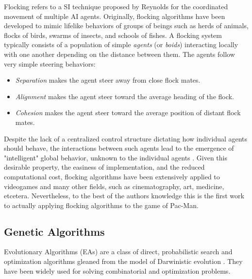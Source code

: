 \documentclass{llncs}
\begin{document}
Flocking refers to a SI technique proposed by Reynolds \cite{Reynolds87} for the coordinated movement of multiple AI agents. Originally, flocking algorithms have been developed to mimic lifelike behaviors of groups of beings such as herds of animals, flocks of birds, swarms of insects, and schools of fishes. A flocking system typically consists of a population of simple \textit{agents} (or \textit{boids}) interacting locally with one another depending on the distance between them. The agents follow very simple steering behaviors:

\begin{itemize}
	\item \textit{Separation} makes the agent steer away from close flock mates.
	\item \textit{Alignment} makes the agent steer toward the average heading of the flock.
	\item \textit{Cohesion} makes the agent steer toward the average position of distant flock mates.
\end{itemize} 

Despite the lack of a centralized control structure dictating how individual agents should behave, the interactions between such agents lead to the emergence of "intelligent" global behavior, unknown to the individual agents \cite{SpectorEtAl03}. Given this desirable property, the easiness of implementation, and the reduced computational cost, flocking algorithms have been extensively applied to videogames \cite{Scutt02} and many other fields, such as cinematography, art, medicine, etcetera. Nevertheless, to the best of the authors knowledge this is the first work to actually applying flocking algorithms to the game of Pac-Man.

\subsection{Genetic Algorithms}
\label{subsec:GAs}

Evolutionary Algorithms (EAs) are a class of direct, probabilistic search and optimization algorithms gleaned from the model of Darwinistic evolution \cite{EAs_Back96}. They have been widely used for solving combinatorial and optimization problems.
\end{document}
